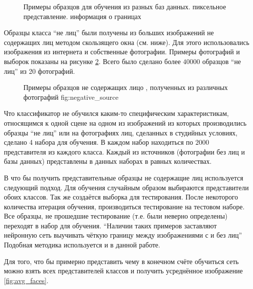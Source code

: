 \documentclass[12pt]{report}
\begin{document}
\begin{figure}[h]
	\centering
	\caption{Примеры образцов для обучения из разных баз данных.  пиксельное представление. 
 информация о границах}
	\label{fig:sample_faces}
\end{figure}

Образцы класса ``не лиц'' были получены из больших изображений не содержащих лиц методом скользящего окна (см. ниже). 
Для этого использовались изображения из интернета и собственные фотографии. Примеры фотографий и выборок показаны на 
рисунке \ref{fig:sample_nonfaces}. Всего было сделано более $40 000$ образцов ``не лиц'' из 20 фотографий.

\begin{figure}[h]
	\centering
	\caption{Примеры образцов не содержащих лицо , полученных из различных фотографий \subref
{fig:negative_source}}
	\label{fig:sample_nonfaces}
\end{figure}

Что классификатор не обучился каким-то специфическим характеристикам, относящимся к одной сцене на одном из 
изображений из которых производились образцы ``не лиц'' или на фотографиях лиц, сделанных в студийных условиях, 
сделано 4 набора для обучения. В каждом набор находиться по $2 000$ представителя из каждого класса. Каждый из 
источников (фотографии без лиц и базы данных) представлены в данных наборах в равных количествах.

В \citep{rowley1998neural} что бы получить представительные образцы не содержащие лиц используется следующий подход. 
Для обучения случайным образом выбираются представители обоих классов. Так же создаётся выборка для тестирования. 
После некоторого количества итерация обучения, производиться тестирование на тестовом наборе. Все образцы, не 
прошедшие тестирование (т.е. были неверно определены) переходят в набор для обучения. ``Наличии таких примеров 
заставляют нейронную сеть выучивать чёткую границу между изображениями с и без лиц'' \citep{rowley1998neural} 
Подобная методика используется и в данной работе.

Для того, что бы примерно представить чему в конечном счёте обучиться сеть можно взять всех представителей классов и 
получить усреднённое изображение \ref{fig:avg_faces}.
\end{document}
